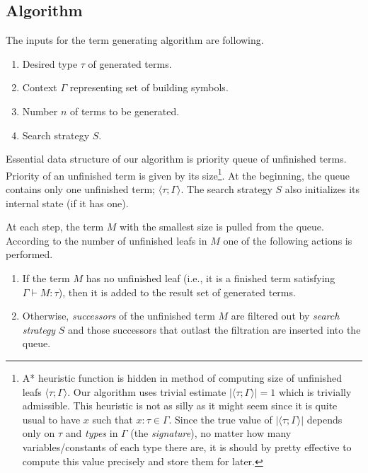 \documentclass[conference]{IEEEtran}
\newcommand{\tur}[3]{#1\vdash{}#2 \colon #3}
\newcommand{\ul}[2]{\langle #1 ; #2 \rangle}
\newcommand{\red}[1]{{\color{red} #1}}
\begin{document}
\subsection{Algorithm}

The inputs for the term generating algorithm are following.
\begin{enumerate}
 \item Desired type $\tau$ of generated terms.
 \item Context $\Gamma$ representing set of building symbols.
 \item Number $n$ of terms to be generated.
 \item Search strategy $S$. 
\end{enumerate}

Essential data structure of our algorithm 
is priority queue of unfinished terms. 
Priority of an unfinished term is given by its size\footnote{
A* heuristic function is hidden in method of computing
size of unfinished leafs $\ul{\tau}{\Gamma}$. Our algorithm uses
trivial estimate $\vert\ul{\tau}{\Gamma}\vert = 1$ which is trivially admissible.
This heuristic is not as silly as it might seem since it is
quite usual to have $x$ such that $x : \tau \in \Gamma$.
Since the true value of $\vert\ul{\tau}{\Gamma}\vert$ depends only on
$\tau$ and \textit{types} in $\Gamma$ (the \textit{signature}), 
no matter how many variables/constants of
each type there are, it is should by pretty effective to compute this
value precisely and store them for later. 
}.
At the beginning, the queue contains only one unfinished term; 
$\ul{\tau}{\Gamma}$. The search strategy $S$ also 
initializes its internal state (if it has one).

At each step, the term $M$ with the smallest size
is pulled from the queue.
According to the number of unfinished leafs in $M$ one of
the following actions is performed.
\begin{enumerate}
 \item If the term $M$ has no unfinished leaf (i.e., it is a finished
 term satisfying \mbox{$\tur{\Gamma}{M}{\tau}$}), then it is added to the
 result set
 of generated terms.   
 \item Otherwise, \textit{successors} of the unfinished term $M$ are
       filtered out by \textit{search strategy} $S$ and
       those successors that outlast the filtration 
       are inserted into the queue.
\end{enumerate}
\end{document}
